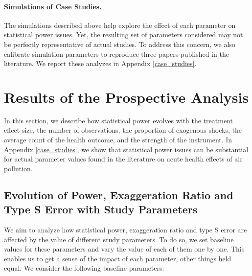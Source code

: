 \documentclass[12pt]{article}
\begin{document}
        \paragraph{Simulations of Case Studies.} The simulations described above help explore the effect of each parameter on statistical power issues. Yet, the resulting set of parameters considered may not be perfectly representative of actual studies. To address this concern, we also calibrate simulation parameters to reproduce three papers published in the literature. We report these analyzes in Appendix \ref{case_studies}.




\section{Results of the Prospective Analysis}\label{section_results}

        In this section, we describe how statistical power evolves with the treatment effect size, the number of observations, the proportion of exogenous shocks, the average count of the health outcome, and the strength of the instrument. In Appendix \ref{case_studies}, we show that statistical power issues can be substantial for actual parameter values found in the literature on acute health effects of air pollution. 

        \subsection{Evolution of Power, Exaggeration Ratio and Type S Error with Study Parameters}

        We aim to analyze how statistical power, exaggeration ratio and type S error are affected by the value of different study parameters. To do so, we set baseline values for these parameters and vary the value of each of them one by one. This enables us to get a sense of the impact of each parameter, other things held equal. We consider the following baseline parameters:
\end{document}
